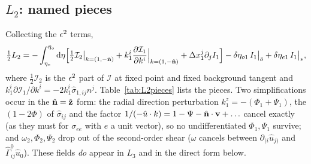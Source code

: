 \subsection{\texorpdfstring{$L_2$}{L2}: named pieces}
\label{sec:L2}
Collecting the $\epsilon^2$ terms,
\begin{equation}
\tfrac12L_2=-\int_{\eta_*}^{\bar\eta_o}\mathrm d\eta\Big[\tfrac12\mathcal I_2\big|_{k=(1,-\hat{\mathbf n})}+k_1^i\frac{\partial\mathcal I_1}{\partial k^i}\Big|_{k=(1,-\hat{\mathbf n})}+\Delta x_1^j\partial_jI_1\Big]
-\delta\eta_{o1}\,I_1\big|_{\bar o}+\delta\eta_{e1}\,I_1\big|_*,
\label{eq:L2gen}
\end{equation}
where $\tfrac12\mathcal I_2$ is the $\epsilon^2$ part of $\mathcal I$ at fixed point and fixed background tangent and
$k_1^i\partial\mathcal I_1/\partial k^i=-2k_1^i\hat\sigma_{1,ij}n^j$.  Table~\ref{tab:L2pieces} lists the pieces.  Two
simplifications occur in the $\hat{\mathbf n}=\hat{\mathbf z}$ form: the radial direction perturbation $k_1^z=-(\Phi_1+\Psi_1)$, the
$(1-2\Phi)$ of $\hat\sigma_{ij}$ and the factor $1/(-\hat u\cdot k)=1-\Psi-\hat{\mathbf n}\cdot\mathbf v+\ldots$ cancel exactly (as they must for
$\sigma_{ee}$ with $e$ a unit vector), so no undifferentiated $\Phi_1,\Psi_1$ survive; and $\omega_2,\Phi_2,\Psi_2$ drop out of the
second-order shear ($\omega$ cancels between $\partial_{(i}\hat u_{j)}$ and $\hat\Gamma^0_{ij}\hat u_0$).  These fields
\emph{do} appear in $L_3$ and in the direct form below.

